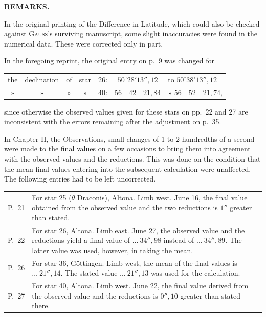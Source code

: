\clearpage
\vspace*{14mm}
\begin{center}\textbf{REMARKS.}\end{center}
{\small
In the original printing of the Difference in Latitude, which could also be checked against
\textsc{Gauss}'s surviving manuscript, some slight inaccuracies were found in the numerical
data. These were corrected only in part.

In the foregoing reprint, the original entry on p.\ 9 was changed for
\begin{center}
\par\noindent\begin{tabular}{ccccccl}
the&declination&of&star&26:&$50^\circ28'13''{,}12$&to $50^\circ38'13''{,}12$\\
»&»&»&»&40:&$56\quad42\quad21{,}84$&» $56\quad52\quad21{,}74$,
\end{tabular}
\end{center}
since otherwise the observed values given for these stars on pp.\ 22 and 27 are inconsistent
with the errors remaining after the adjustment on p.\ 35.

In Chapter II, the Observations, small changes of 1 to 2 hundredths of a second were made to
the final values on a few occasions to bring them into agreement with the observed values
and the reductions. This was done on the condition that the mean final values entering into
the subsequent calculation were unaffected. The following entries had to be left uncorrected.
\par\noindent\begin{tabular}{@{}p{.065\linewidth}p{.91\linewidth}@{}}
P.\ 21&For star 25 ($\theta$ Draconis), Altona. Limb west. June 16, the final value obtained
from the observed value and the two reductions is $1''$ greater than stated.\\
P.\ 22&For star 26, Altona. Limb east. June 27, the observed value and the reductions yield
a final value of $\ldots\ 34''{,}98$ instead of $\ldots\ 34''{,}89$. The latter value was used,
however, in taking the mean.\\
P.\ 26&For star 36, Göttingen. Limb west, the mean of the final values is $\ldots\ 21''{,}14$.
The stated value $\ldots\ 21''{,}13$ was used for the calculation.\\
P.\ 27&For star 40, Altona. Limb west. June 22, the final value derived from the observed value
and the reductions is $0''{,}10$ greater than stated there.
\end{tabular}

}

